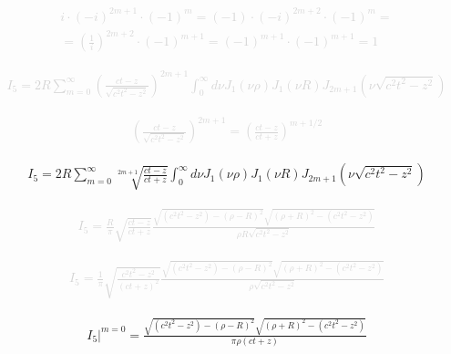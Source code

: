 \textcolor{lightgray}{ \begin{equation*} \begin{aligned}
i \cdot (-i)^{2m+1} \cdot (-1)^m = (-1) \cdot (-i)^{2m+2} \cdot (-1)^m = \\
= \left( \frac{1}{i} \right)^{2m+2} \cdot (-1)^{m+1} = 
(-1)^{m+1} \cdot (-1)^{m+1} = 1
\end{aligned}  \end{equation*} }

\textcolor{lightgray}{ \begin{equation*} \begin{aligned}
I_5 = 2 R \sum_{m=0}^{\infty}
\left( \frac{ct-z}{\sqrt{c^2t^2-z^2}} \right)^{2m+1}
\int_0^\infty d \nu J_1(\nu \rho) J_1(\nu R) 
J_{2m+1} \left( \nu \sqrt{c^2t^2 - z^2} \right)
\end{aligned}  \end{equation*} }

\textcolor{lightgray}{ \begin{equation*} \begin{aligned}
\left( \frac{ct-z}{\sqrt{c^2t^2-z^2}} \right)^{2m+1} = 
\left( \frac{ct-z}{ct+z} \right)^{m+1/2}
\end{aligned}  \end{equation*} }

\begin{equation} \begin{aligned} \label{eq:i5series}
I_5 = 2 R \sum_{m=0}^{\infty}
\sqrt[2m+1]{\frac{ct-z}{ct+z}}
\int_0^\infty d \nu J_1(\nu \rho) J_1(\nu R) 
J_{2m+1} \left( \nu \sqrt{c^2t^2 - z^2} \right)
\end{aligned}  \end{equation}

\textcolor{lightgray}{ \begin{equation*} \begin{aligned}
I_5 = \frac{R}{\pi}
\sqrt{\frac{ct-z}{ct+z}}
\frac{\sqrt{ (c^2t^2 - z^2) - (\rho - R)^2} 
\sqrt{(\rho + R)^2 - (c^2t^2 - z^2)}}
{\rho R \sqrt{c^2t^2 - z^2}}
\end{aligned}  \end{equation*} }

\textcolor{lightgray}{ \begin{equation*} \begin{aligned}
I_5 = \frac{1}{\pi}
\sqrt{\frac{c^2t^2-z^2}{(ct+z)^2}}
\frac{\sqrt{ (c^2t^2 - z^2) - (\rho - R)^2} 
\sqrt{(\rho + R)^2 - (c^2t^2 - z^2)}}
{\rho \sqrt{c^2t^2 - z^2}}
\end{aligned}  \end{equation*} }

\begin{equation} \begin{aligned} \label{eq:i50}
\left. I_5 \right|^{m=0} = \frac{\sqrt{(c^2t^2 - z^2) - (\rho-R)^2} 
\sqrt{(\rho+R)^2 - (c^2t^2 - z^2)}}
{\pi \rho (ct+z)}
\end{aligned}  \end{equation}
